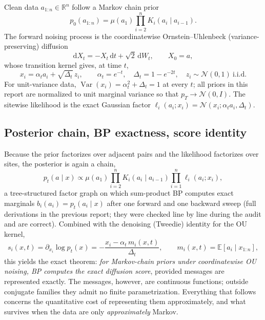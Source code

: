 \documentclass[11pt]{article}
\newcommand{\R}{\mathbb{R}}
\newcommand{\E}{\mathbb{E}}
\newcommand{\Var}{\operatorname{Var}}
\newcommand{\Normal}{\mathcal{N}}
\begin{document}
Clean data $a_{1:n}\in\R^n$ follow a Markov chain prior
\begin{equation}
  p_0(a_{1:n}) = \mu(a_1)\prod_{i=2}^n K_i(a_i\mid a_{i-1}).
  \label{eq:markov-prior}
\end{equation}
The forward noising process is the coordinatewise Ornstein--Uhlenbeck
(variance-preserving) diffusion
\begin{equation}
  \mathrm dX_t = -X_t\,\mathrm dt + \sqrt2\,\mathrm dW_t,\qquad X_0 = a,
\end{equation}
whose transition kernel gives, at time $t$,
\begin{equation}
  x_i = \alpha_t a_i + \sqrt{\Delta_t}\,z_i,\qquad
  \alpha_t = e^{-t},\quad \Delta_t = 1-e^{-2t},\quad z_i\sim\Normal(0,1)\ \text{i.i.d.}
  \label{eq:ou}
\end{equation}
For unit-variance data, $\Var(x_i)=\alpha_t^2+\Delta_t=1$ at every $t$; all priors in
this report are normalized to unit marginal variance so that $p_T\to\Normal(0,I)$.
The sitewise likelihood is the exact Gaussian factor
$\ell_i(a_i;x_i)=\Normal(x_i;\alpha_t a_i,\Delta_t)$.

\subsection{Posterior chain, BP exactness, score identity}

Because the prior factorizes over adjacent pairs and the likelihood factorizes over
sites, the posterior is again a chain,
\begin{equation}
  p_t(a\mid x) \propto \mu(a_1)\prod_{i=2}^n K_i(a_i\mid a_{i-1})
  \prod_{i=1}^n \ell_i(a_i;x_i),
  \label{eq:posterior-chain}
\end{equation}
a tree-structured factor graph on which sum-product BP computes exact marginals
$b_i(a_i)=p_t(a_i\mid x)$ after one forward and one backward sweep (full derivations
in the previous report; they were checked line by line during the audit and are
correct). Combined with the denoising (Tweedie) identity for the OU kernel,
\begin{equation}
  \boxed{\;
  s_i(x,t) = \partial_{x_i}\log p_t(x)
  = -\frac{x_i - \alpha_t\, m_i(x,t)}{\Delta_t},
  \qquad m_i(x,t) = \E[a_i\mid x_{1:n}],\;}
  \label{eq:score-identity}
\end{equation}
this yields the exact theorem: \emph{for Markov-chain priors under coordinatewise OU
noising, BP computes the exact diffusion score}, provided messages are represented
exactly. The messages, however, are continuous functions; outside conjugate families
they admit no finite parametrization. Everything that follows concerns the
quantitative cost of representing them approximately, and what survives when the data
are only \emph{approximately} Markov.
\end{document}
